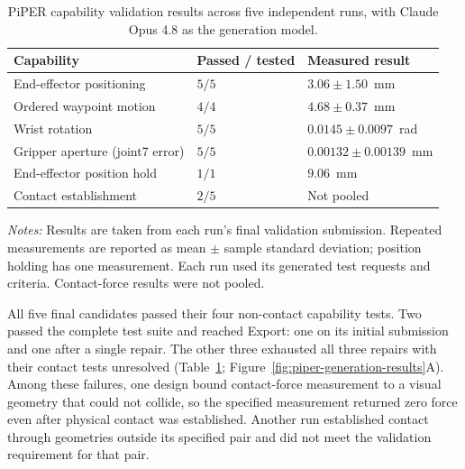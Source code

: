 \begin{table}[H]
  \centering
  \begingroup
  \small
  \setlength{\tabcolsep}{4pt}
  \renewcommand{\arraystretch}{1.12}
  \caption{PiPER capability validation results across five independent runs, with Claude Opus 4.8 as the generation model.}
  \label{tab:piper-validation-summary}
  \begin{tabularx}{\textwidth}{@{}
    >{\raggedright\arraybackslash}X
    >{\centering\arraybackslash}p{24mm}
    >{\raggedleft\arraybackslash}p{49mm}@{}}
    \toprule
    \textbf{Capability} &
    \textbf{Passed / tested} &
    \textbf{Measured result} \\
    \midrule
    End-effector positioning & $5/5$ & $3.06 \pm 1.50$~mm \\
    Ordered waypoint motion & $4/4$ & $4.68 \pm 0.37$~mm \\
    Wrist rotation & $5/5$ & $0.0145 \pm 0.0097$~rad \\
    Gripper aperture (joint7 error) & $5/5$ & $0.00132 \pm 0.00139$~mm \\
    End-effector position hold & $1/1$ & $9.06$~mm \\
    Contact establishment & $2/5$ & Not pooled \\
    \bottomrule
  \end{tabularx}
  \par\smallskip
  \noindent\raggedright\emph{Notes:} Results are taken from each run's final
  validation submission. Repeated measurements are reported as mean
  $\pm$ sample standard deviation; position holding has one measurement.
  Each run used its generated test requests and criteria. Contact-force
  results were not pooled.\par
  \endgroup
\end{table}

All five final candidates passed their four non-contact capability tests.
Two passed the complete test suite and reached Export: one on its initial
submission and one after a single repair. The other three exhausted all
three repairs with their contact tests unresolved
(Table~\ref{tab:piper-validation-summary};
Figure~\ref{fig:piper-generation-results}A). Among these failures, one design
bound contact-force measurement to a visual geometry that could not collide,
so the specified measurement returned zero force even after physical contact
was established. Another run established contact through geometries outside
its specified pair and did not meet the validation requirement for that pair.

